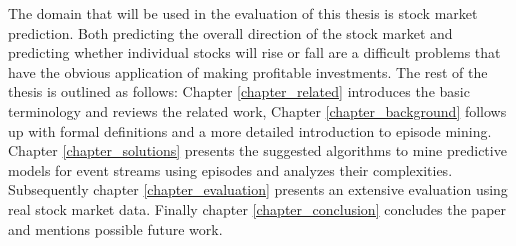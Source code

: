 The domain that will be used in the evaluation of this thesis is stock market prediction. Both predicting the overall direction of the stock market and predicting whether individual stocks will rise or fall are a difficult problems that have the obvious application of making profitable investments. \newline
The rest of the thesis is outlined as follows: Chapter \ref{chapter_related} introduces the basic terminology and reviews the related work, Chapter \ref{chapter_background} follows up with formal definitions and a more detailed introduction to episode mining. Chapter \ref{chapter_solutions} presents the suggested algorithms to mine predictive models for event streams using episodes and analyzes their complexities. Subsequently chapter \ref{chapter_evaluation} presents an extensive evaluation using real stock market data. Finally chapter \ref{chapter_conclusion} concludes the paper and mentions possible future work.



